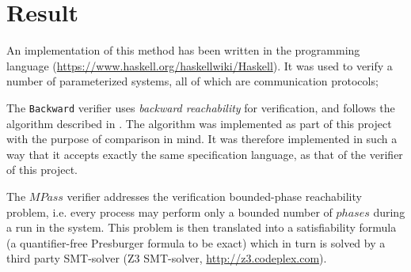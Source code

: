 \section{Result}
\label{results}
An implementation of this method has been written in the  programming language (\url{https://www.haskell.org/haskellwiki/Haskell}). It was used to verify a number of parameterized systems, all of which are communication protocols;

\vspace{10pt}
\vspace{10pt}

The \texttt{Backward} verifier uses \emph{backward reachability} for verification, and follows the algorithm described in \cite{287591}. The algorithm was implemented as part of this project with the purpose of comparison in mind. It was therefore implemented in such a way that it accepts exactly the same specification language, as that of the verifier of this project.

The $MPass$ verifier addresses the verification bounded-phase reachability problem, i.e. every process may perform only a bounded number of $phases$ during a run in the system. This problem is then translated into a satisfiability formula (a quantifier-free Presburger formula to be exact) which in turn is solved by a third party SMT-solver (Z3 SMT-solver, \url{http://z3.codeplex.com}).


